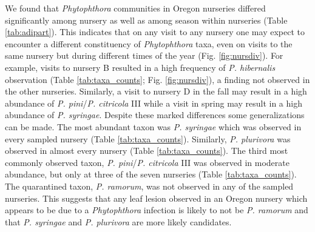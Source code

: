 \documentclass[12pt]{article}
\begin{document}
We found that \emph{Phytophthora} communities in Oregon nurseries differed significantly among nursery as well as among season within nurseries (Table \ref{tab:adipart}).  This indicates that on any visit to any nursery one may expect to encounter a different constituency of \emph{Phytophthora} taxa, even on visits to the same nursery but during different times of the year (Fig. \ref{fig:nursdiv}).  For example, visits to nursery B resulted in a high frequency of \emph{P. hibernalis} observation (Table \ref{tab:taxa_counts}; Fig. \ref{fig:nursdiv}), a finding not observed in the other nurseries.  Similarly, a visit to nursery D in the fall may result in a high abundance of \emph{P. pini}/\emph{P. citricola} III while a visit in spring may result in a high abundance of \emph{P. syringae}.  Despite these marked differences some generalizations can be made.  The most abundant taxon was \emph{P. syringae} which was observed in every sampled nursery (Table \ref{tab:taxa_counts}).  Similarly, \emph{P. plurivora} was observed in almost every nursery (Table \ref{tab:taxa_counts}).  The third most commonly observed taxon, \emph{P. pini}/\emph{P. citricola} III was observed in moderate abundance, but only at three of the seven nurseries (Table \ref{tab:taxa_counts}).  The quarantined taxon, \emph{P. ramorum}, was not observed in any of the sampled nurseries.  This suggests that any leaf lesion observed in an Oregon nursery which appears to be due to a \emph{Phytophthora} infection is likely to not be \emph{P. ramorum} and that \emph{P. syringae} and \emph{P. plurivora} are more likely candidates.

\end{document}
